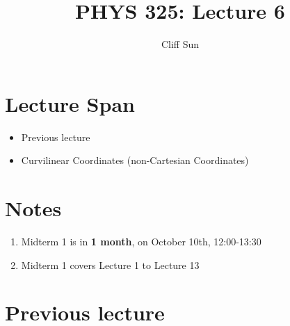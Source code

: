 \documentclass{article}
\title{PHYS 325: Lecture 6}
\author{Cliff Sun}
\newtheorem{one minute paper}[theorem]{One Minute Paper}
\begin{document}
\maketitle

\section*{Lecture Span}
\begin{itemize}
    \item Previous lecture
    \item Curvilinear Coordinates (non-Cartesian Coordinates)
\end{itemize}

\section*{Notes}
\begin{enumerate}
    \item Midterm 1 is in \textbf{1 month}, on October 10th, 12:00-13:30
    \item Midterm 1 covers Lecture 1 to Lecture 13
\end{enumerate}

\section*{Previous lecture}
\end{document}
